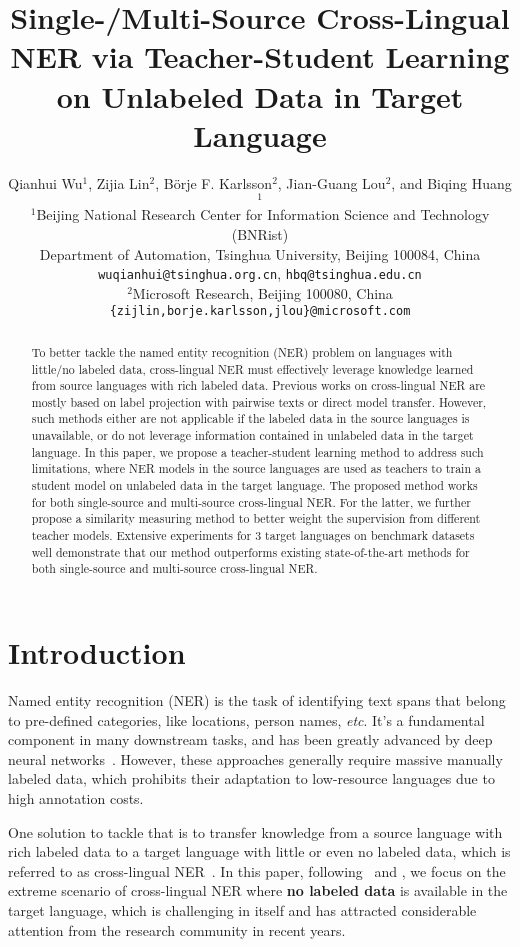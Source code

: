 \documentclass[11pt,a4paper]{article}
\title{Single-/Multi-Source Cross-Lingual NER via Teacher-Student Learning on Unlabeled Data in Target Language}
\author{Qianhui Wu$^1$, Zijia Lin$^2$, B\"orje F. Karlsson$^2$, Jian-Guang Lou$^2$, and Biqing Huang$^1$ \\
	$^1$Beijing National Research Center for Information Science and Technology (BNRist) \\
	Department of Automation, Tsinghua University, Beijing 100084, China \\
	\texttt{wuqianhui@tsinghua.org.cn}, \texttt{hbq@tsinghua.edu.cn} \\
	$^2$Microsoft Research, Beijing 100080, China \\
	\texttt{\{zijlin,borje.karlsson,jlou\}@microsoft.com} 
}
\date{}
\newcommand\etc{\textit{etc}}
\begin{document}
	\maketitle
	\begin{abstract}
		To better tackle the named entity recognition (NER) problem on languages with little/no labeled data, cross-lingual NER must effectively leverage knowledge learned from source languages with rich labeled data. 
		Previous works on cross-lingual NER are mostly based on label projection with pairwise texts or direct model transfer. 
		However, such methods either are not applicable if the labeled data in the source languages is unavailable, or do not leverage information contained in unlabeled data in the target language.
In this paper, we propose a teacher-student learning method to address such limitations, where NER models in the source languages are used as teachers to train a student model on unlabeled data in the target language. The proposed method works for both single-source and multi-source cross-lingual NER. 
		For the latter, we further propose a similarity measuring method to better weight the supervision from different teacher models. 
		Extensive experiments for 3 target languages on benchmark datasets well demonstrate that our method outperforms existing state-of-the-art methods for both single-source and multi-source cross-lingual NER.
	\end{abstract}
	
	
	\section{Introduction}
	Named entity recognition (NER) is the task of identifying text spans that belong to pre-defined categories, like locations, person names, \etc. 
	It's a fundamental component in many downstream tasks, and has been greatly advanced by deep neural networks~\cite{lample2016neural,chiu2016named,peters2017semi}.
	However, these approaches generally require massive manually labeled data, which prohibits their adaptation to low-resource languages due to high annotation costs. 
	
	One solution to tackle that is to transfer knowledge from a source language with rich labeled data to a target language with little or even no labeled data, which is referred to as cross-lingual NER~\cite{wu2019beto,wu2020enhanced}.
	In this paper, following~\citet{wu2019beto} and \citet{wu2020enhanced}, we focus on the extreme scenario of cross-lingual NER where \textbf{no labeled data} is available in the target language, which is challenging in itself and has attracted considerable attention from the research community in recent years.
	
\end{document}
